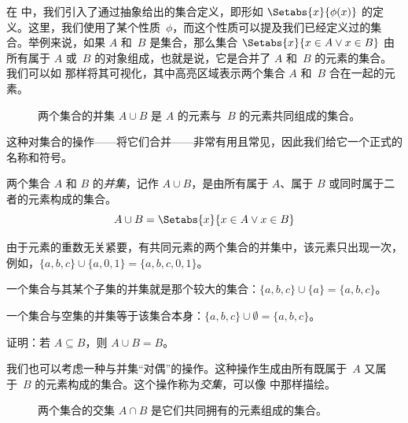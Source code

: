 \documentclass[../../../include/open-logic-section]{subfiles}
\begin{document}

\begin{explain}
在  中，我们引入了通过抽象给出的集合定义，即形如 $\Setabs{x}{\phi(x)}$ 的定义。这里，我们使用了某个性质~$\phi$，而这个性质可以提及我们已经定义过的集合。举例来说，如果 $A$ 和~$B$ 是集合，那么集合 $\Setabs{x}{x \in A \lor x \in B}$ 由所有属于 $A$ 或~$B$ 的对象组成，也就是说，它是合并了 $A$ 和~$B$ 的元素的集合。我们可以如  那样将其可视化，其中高亮区域表示两个集合 $A$ 和~$B$ 合在一起的元素。

\begin{figure}
  \caption{两个集合的并集 $A \cup B$ 是 $A$ 的元素与~$B$ 的元素共同组成的集合。}
\end{figure}

这种对集合的操作——将它们合并——非常有用且常见，因此我们给它一个正式的名称和符号。
\end{explain}

\begin{defn}[并集]
两个集合 $A$ 和 $B$ 的\emph{并集}，记作 $A \cup B$，是由所有属于 $A$、属于 $B$ 或同时属于二者的元素构成的集合。
\[
A \cup B = \Setabs{x}{x \in A \lor x \in B}
\]
\end{defn}

\begin{ex}
由于元素的重数无关紧要，有共同元素的两个集合的并集中，该元素只出现一次，例如，$\{ a, b, c\} \cup \{ a, 0, 1\} = \{a, b, c, 0, 1\}$。

一个集合与其某个子集的并集就是那个较大的集合：$\{a,
b, c \} \cup \{a \} = \{a, b, c\}$。

一个集合与空集的并集等于该集合本身：$\{a,
b, c \} \cup \emptyset = \{a, b, c \}$。
\end{ex}

\begin{prob}
证明：若 $A \subseteq B$，则 $A \cup B = B$。
\end{prob}

\begin{explain}
我们也可以考虑一种与并集“对偶”的操作。这种操作生成由所有既属于~$A$ 又属于~$B$ 的元素构成的集合。这个操作称为\emph{交集}，可以像  中那样描绘。
\begin{figure}
  \caption{两个集合的交集 $A \cap B$ 是它们共同拥有的元素组成的集合。}
\end{figure}
\end{explain}
\end{document}
